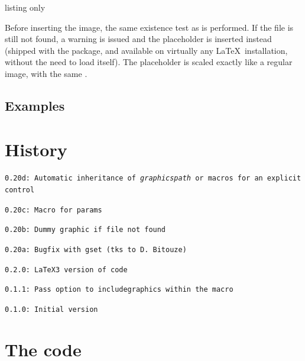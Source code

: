 \documentclass[11pt,a4paper]{ltxdoc}
\begin{document}
\begin{DemoCode}{listing only}
\end{DemoCode}

Before inserting the image, the same existence test as \ShowCode{\\inlinegraphics} is performed. If the file is still not found, a warning is issued and the  placeholder is inserted instead (shipped with the  package, and available on virtually any \LaTeX\ installation, without the need to load  itself). The placeholder is scaled exactly like a regular image, with the same \ShowCode{[options]}.

\subsection{Examples}

\begin{DemoCode}{}
\end{DemoCode}

\begin{DemoCode}{}
\end{DemoCode}

\pagebreak

\section{History}

\texttt{0.20d: Automatic inheritance of \textit{graphicspath} or macros for an explicit control}

\texttt{0.20c: Macro for params}

\texttt{0.20b: Dummy graphic if file not found}

\texttt{0.20a: Bugfix with gset (tks to D. Bitouze)}

\texttt{0.2.0: LaTeX3 version of code}

\texttt{0.1.1: Pass option to includegraphics within the macro}

\texttt{0.1.0: Initial version}

\section{The code}

\end{document}
